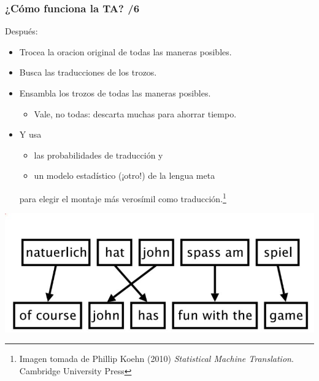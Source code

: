 \documentclass{beamer}
\begin{document}
\begin{frame}
  \frametitle{¿Cómo funciona la TA? /6}
  Después:
  \begin{itemize}
  \item Trocea la oracion original de todas las maneras posibles.\pause
  \item Busca las traducciones de los trozos.\pause
  \item Ensambla los trozos de todas las maneras posibles.\pause
    \begin{itemize}
    \item Vale, no todas: descarta muchas para ahorrar tiempo.\pause
    \end{itemize}
  \item Y usa 
    \begin{itemize}
    \item las probabilidades de traducción y\pause
    \item un modelo estadístico (¡otro!) de la lengua meta\pause
    \end{itemize}
   para elegir el montaje más verosímil como traducción.\footnote{Imagen tomada de Phillip Koehn (2010) \emph{Statistical Machine Translation}. Cambridge University Press}
  \end{itemize}
\begin{center}
\includegraphics[scale=0.21]{phrasebasedexample.jpg}
\end{center}
\end{frame}
\end{document}
